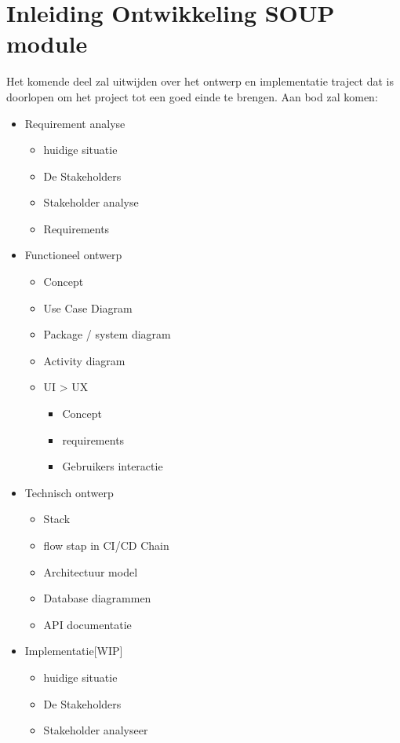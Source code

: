 
\chapter{Inleiding Ontwikkeling SOUP module}\label{ch:inleiding-ontwikkeling-soup-module} %
Het komende deel zal uitwijden over het ontwerp en implementatie traject dat is doorlopen om het project tot een goed einde te brengen. Aan bod zal komen:
\begin{itemize}
  \item Requirement analyse
  \begin{itemize}
    \item huidige situatie
    \item De Stakeholders
    \item Stakeholder analyse
    \item Requirements
  \end{itemize}
  \item Functioneel ontwerp
  \begin{itemize}
    \item Concept
    \item Use Case Diagram
    \item Package / system diagram
    \item Activity diagram
    \item UI > UX
    \begin{itemize}
      \item Concept
      \item requirements
      \item Gebruikers interactie
    \end{itemize}
  \end{itemize}
  \item Technisch ontwerp
  \begin{itemize}
    \item Stack
    \item flow stap in CI/CD Chain
    \item Architectuur model
    \item Database diagrammen
    \item API documentatie
  \end{itemize}
  \item Implementatie[WIP]
  \begin{itemize}
    \item huidige situatie
    \item De Stakeholders
    \item Stakeholder analyseer

\end{itemize}
\end{itemize}
